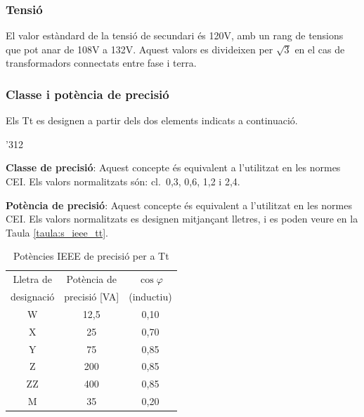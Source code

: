 \subsubsection{Tensi\'{o}}

El valor est\`{a}ndard de la tensi\'{o} de
secundari \'{e}s 120\unit{V}, amb un rang de tensions que pot anar de 108\unit{V} a 132\unit{V}. Aquest valors es divideixen per $\sqrt{3}$ en el cas de transformadors connectats entre fase i terra.


\subsubsection{Classe i pot\`{e}ncia de precisi\'{o}}

Els Tt es designen a partir dels dos
elements indicats a continuaci\'{o}.

\begin{dingautolist}{'312}
    \item \textbf{Classe de precisi\'{o}}: Aquest concepte \'{e}s equivalent
    a l'utilitzat en les normes \textsf{CEI}. Els valors
    normalitzats s\'{o}n: cl.~0,3, 0,6, 1,2 i 2,4.
    \item \textbf{Pot\`{e}ncia de precisi\'{o}}: Aquest concepte \'{e}s equivalent
    a l'utilitzat en les normes \textsf{CEI}. Els valors
    normalitzats es designen mitjan\c{c}ant lletres, i es poden veure en
    la Taula \vref{taula:s_ieee_tt}.

    \begin{table}[h]
    \caption{\label{taula:s_ieee_tt} Pot\`{e}ncies \textsf{IEEE} de precisi\'{o}  per a Tt}
    \begin{center}\begin{tabular}{ccc}
    \toprule[1pt]
    Lletra de & Pot\`{e}ncia de & $\cos\varphi$\\
    designaci\'{o} &  precisi\'{o} [VA] &  (inductiu)\\
    \midrule
        W & 12,5 & 0,10\\
        X & 25 & 0,70 \\
        Y & 75 & 0,85 \\
        Z & 200 & 0,85 \\
        ZZ & 400 & 0,85 \\
        M & 35 & 0,20 \\
    \bottomrule[1pt]
    \end{tabular} \end{center}
    \end{table}
\end{dingautolist}

